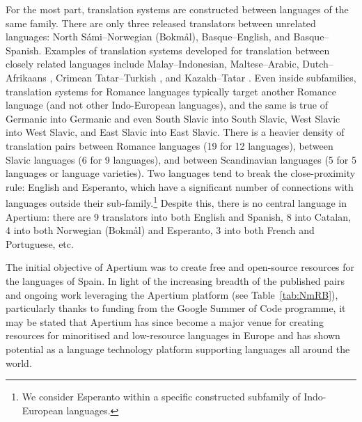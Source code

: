 \documentclass[free]{flammie}
\begin{document}
For the most part, translation systems are constructed between languages of the
same family. There are only three released translators between unrelated
languages: North Sámi--Norwegian (Bokmål), Basque--English, and Basque--Spanish.
Examples of translation systems developed for translation between closely
related languages include Malay--Indonesian, Maltese--Arabic, Dutch--Afrikaans
\cite{otte2011rapid}, Crimean Tatar--Turkish \cite{gokirmak2017dependency}, and
Kazakh--Tatar \cite{salimzyanov2013free}. Even inside subfamilies, translation
systems for Romance languages typically target another Romance language (and not
other Indo-European languages), and the same is true of Germanic into Germanic
and even South Slavic into South Slavic, West Slavic into West Slavic, and East
Slavic into East Slavic. There is a heavier density of translation pairs between
Romance languages (19 for 12 languages), between Slavic languages (6 for 9
languages), and between Scandinavian languages (5 for 5 languages or language
varieties). Two languages tend to break the close-proximity rule: English and
Esperanto, which have a significant number of connections with languages outside
their sub-family.\footnote{We consider Esperanto within a specific constructed
subfamily of Indo-European languages.} Despite this, there is no central
language in Apertium: there are 9 translators into both English and Spanish, 8
into Catalan, 4 into both Norwegian (Bokmål) and Esperanto, 3 into both French
and Portuguese, etc.

The initial objective of Apertium was to create free and open-source resources
for the languages of Spain. In light of the increasing breadth of the published
pairs and ongoing work leveraging the Apertium platform (see
Table~\ref{tab:NmRB}), particularly thanks to funding from the Google Summer of
Code programme, it may be stated that Apertium has since become a major venue
for creating resources for minoritised and low-resource languages in Europe and
has shown potential as a language technology platform supporting languages all
around the world.
\end{document}

